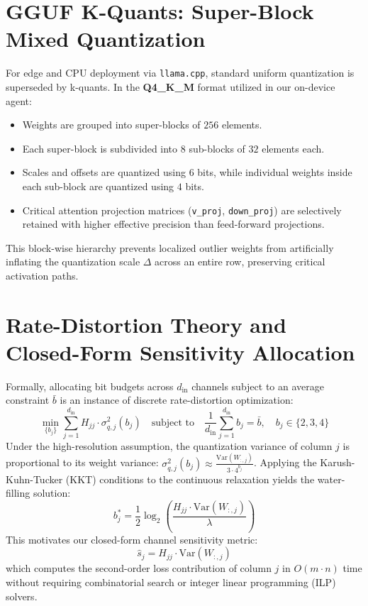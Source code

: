 \documentclass[12pt,a4paper,oneside]{report}
\begin{document}
\section{GGUF K-Quants: Super-Block Mixed Quantization}
For edge and CPU deployment via \texttt{llama.cpp}, standard uniform quantization is superseded by k-quants. In the \textbf{Q4\_K\_M} format utilized in our on-device agent:
\begin{itemize}
    \item Weights are grouped into super-blocks of $256$ elements.
    \item Each super-block is subdivided into $8$ sub-blocks of $32$ elements each.
    \item Scales and offsets are quantized using $6$ bits, while individual weights inside each sub-block are quantized using $4$ bits.
    \item Critical attention projection matrices (\texttt{v\_proj}, \texttt{down\_proj}) are selectively retained with higher effective precision than feed-forward projections.
\end{itemize}
This block-wise hierarchy prevents localized outlier weights from artificially inflating the quantization scale $\Delta$ across an entire row, preserving critical activation paths.

\section{Rate-Distortion Theory and Closed-Form Sensitivity Allocation}
Formally, allocating bit budgets across $d_{\text{in}}$ channels subject to an average constraint $\bar{b}$ is an instance of discrete rate-distortion optimization:
\begin{equation}
    \min_{\{b_j\}} \sum_{j=1}^{d_{\text{in}}} H_{jj} \cdot \sigma^2_{q, j}(b_j) \quad \text{subject to} \quad \frac{1}{d_{\text{in}}} \sum_{j=1}^{d_{\text{in}}} b_j = \bar{b}, \quad b_j \in \{2, 3, 4\}
\end{equation}
Under the high-resolution assumption, the quantization variance of column $j$ is proportional to its weight variance: $\sigma^2_{q, j}(b_j) \approx \frac{\text{Var}(W_{:, j})}{3 \cdot 4^{b_j}}$. Applying the Karush-Kuhn-Tucker (KKT) conditions to the continuous relaxation yields the water-filling solution:
\begin{equation}
    b_j^* = \frac{1}{2} \log_2 \left( \frac{H_{jj} \cdot \text{Var}(W_{:, j})}{\lambda} \right)
\end{equation}
This motivates our closed-form channel sensitivity metric:
\begin{equation}
    \hat{s}_j = H_{jj} \cdot \text{Var}(W_{:, j})
\end{equation}
which computes the second-order loss contribution of column $j$ in $O(m \cdot n)$ time without requiring combinatorial search or integer linear programming (ILP) solvers.
\end{document}
